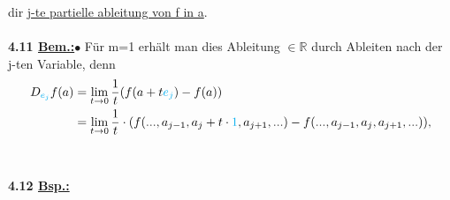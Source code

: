 \documentclass[]{scrartcl}
\begin{document}
	dir \ul{j-te partielle ableitung von f in a}.\\
	\\
	\textbf{4.11 \underline{Bem.:}}$\bullet$ Für m=1 erhält man dies Ableitung $\in \mathbb{R}$ durch Ableiten nach der j-ten Variable, denn 
	\begin{align}
		D_{\textcolor{cyan}{e_j}}f(a)&= \lim\limits_{t\rightarrow 0}\frac{1}{t}(f(a+t\textcolor{cyan}{e_j})-f(a))\\
		&=\lim\limits_{t\rightarrow0}\frac{1}{t}\cdot(f(...,a_{j-1},a_j+t\cdot\textcolor{cyan}{1}, a_{j+1},...)-f(...,a_{j-1},a_j,a_{j+1},...)),
	\end{align} \\
	\\
	\textbf{4.12 \underline{Bsp.:}}
	
	
	
\end{document}
